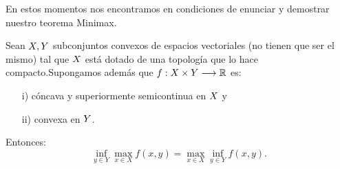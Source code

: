 En estos momentos nos encontramos en condiciones de enunciar y demostrar nuestro teorema Minimax.
\begin{teoremaBox}
Sean $ X, Y $ subconjuntos convexos de espacios vectoriales (no tienen que ser el mismo) tal que $ X $ está dotado de una topología que lo hace compacto.Supongamos además que $ f:  X \times Y \longrightarrow \mathbb{R} $ es:
\begin{itemize}	
\item[i)] cóncava y superiormente semicontinua en $ X $ y
\item[ii)] convexa en $ Y $.
\end{itemize}
Entonces:
\begin{equation}\label{eqMinMax}
\inf_{y \in Y} \max_{x \in X} f(x,y) = \max_{x \in X} \inf_{y \in Y} f(x,y).
\end{equation}
\end{teoremaBox}
